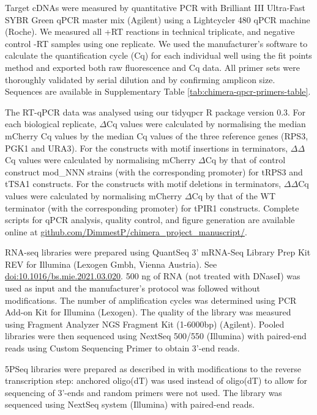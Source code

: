 \documentclass[../main.tex]{subfiles}
\begin{document}
Target cDNAs were measured by quantitative PCR with Brilliant III Ultra-Fast SYBR Green qPCR master mix (Agilent) using a Lightcycler 480 qPCR machine (Roche).
We measured all +RT reactions in technical triplicate, and negative control -RT samples using one replicate.
We used the manufacturer's software to calculate the quantification cycle (Cq) for each individual well using the fit points method and exported both raw fluorescence and Cq data.
All primer sets were thoroughly validated by serial dilution and by confirming amplicon size. Sequences are available in Supplementary Table \ref{tab:chimera-qpcr-primers-table}.

The RT-qPCR data was analysed using our tidyqpcr R package version 0.3.
For each biological replicate, \(\Delta\)Cq values were calculated by normalising the median mCherry Cq values by the median Cq values of the three reference genes (RPS3, PGK1 and URA3).
For the constructs with motif insertions in terminators, \(\Delta\Delta\)Cq values were calculated by normalising mCherry \(\Delta\)Cq by that of control construct mod\_NNN strains (with the corresponding promoter) for tRPS3 and tTSA1 constructs.
For the constructs with motif deletions in terminators, \(\Delta\Delta\)Cq values were calculated by normalising mCherry \(\Delta\)Cq by that of the WT terminator (with the corresponding promoter) for tPIR1 constructs.
Complete scripts for qPCR analysis, quality control, and figure generation are available online at \href{https://github.com/DimmestP/chimera_project_manuscript/}{github.com/DimmestP/chimera\_project\_manuscript/}.

RNA-seq libraries were prepared using QuantSeq 3' mRNA-Seq Library Prep Kit REV for Illumina (Lexogen Gmbh, Vienna Austria).
See \href{https://doi.org/10.1016/bs.mie.2021.03.020}{doi:10.1016/bs.mie.2021.03.020}.
500 ng of RNA (not treated with DNaseI) was used as input and the manufacturer's protocol was followed without modifications.
The number of amplification cycles was determined using PCR Add-on Kit for Illumina (Lexogen).
The quality of the library was measured using Fragment Analyzer NGS Fragment Kit (1-6000bp) (Agilent).
Pooled libraries were then sequenced using NextSeq 500/550 (Illumina) with paired-end reads using Custom Sequencing Primer to obtain 3'-end reads.

5PSeq libraries were prepared as described in \parencite{Zhang2021} with modifications to the reverse transcription step: anchored oligo(dT) was used instead of oligo(dT) to allow for sequencing of 3'-ends and random primers were not used.
The library was sequenced using NextSeq system (Illumina) with paired-end reads.
\end{document}
